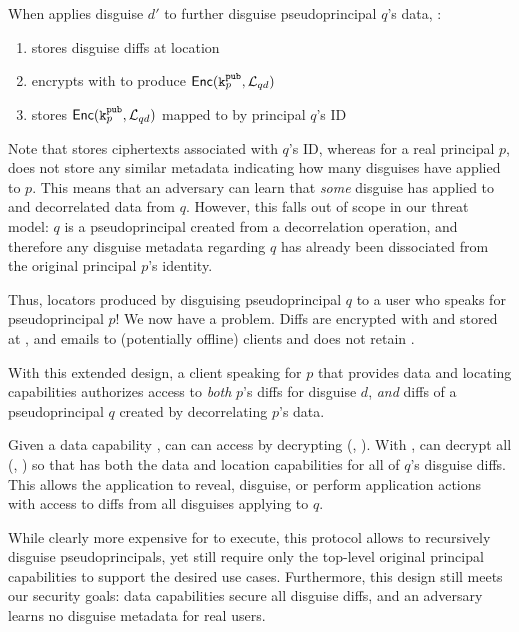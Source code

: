 When \sys applies disguise $d'$ to further disguise pseudoprincipal $q$'s data, \sys:
\begin{enumerate}
    \item stores disguise diffs  at location 
    \item encrypts  with  to produce $\mathsf{Enc}(\texttt{\ensuremath{\texttt{k}^{\text{pub}}_{p}}}, \mathcal{L}_{qd})$
    \item stores $\mathsf{Enc}(\texttt{\ensuremath{\texttt{k}^{\text{pub}}_{p}}}, \mathcal{L}_{qd})$ mapped to by principal $q$'s ID
\end{enumerate}
Note that \sys stores  ciphertexts associated with $q$'s ID, whereas for a real principal
$p$, \sys does not store any similar metadata indicating how many disguises have applied to $p$. 
This means that an adversary can learn that \emph{some} disguise has applied to and
decorrelated data from $q$. However, this falls out of scope in our threat model: $q$ is a
pseudoprincipal created from a decorrelation operation, and therefore any disguise metadata regarding $q$ has already been dissociated from
the original principal $p$'s identity.


Thus, locators  produced by disguising pseudoprincipal $q$ to a user who speaks for pseudoprincipal $p$!
We now have a problem. Diffs are encrypted with  and stored at
, and \sys emails  to (potentially offline) clients and does not retain
.  


  

With this extended design, a client speaking for $p$ that provides data and locating capabilities%
authorizes access to \emph{both} $p$'s diffs for disguise $d$, \emph{and}
diffs of a pseudoprincipal $q$ created by
decorrelating $p$'s data. 

Given a data capability , \sys can can access  by decrypting \enc(,
).
%
With , \sys can decrypt all \enc(, ) so that \sys has both the data and
location capabilities for all of $q$'s disguise diffs. This allows the application to reveal,
disguise, or perform application actions with access to diffs from all disguises applying to $q$.

While clearly more expensive for \sys to execute, this protocol allows \sys to recursively disguise
pseudoprincipals, yet still require only the top-level original principal capabilities to support the
desired use cases. Furthermore, this design still meets our security goals: data capabilities secure
all disguise diffs, and an adversary learns no disguise metadata for real users.

